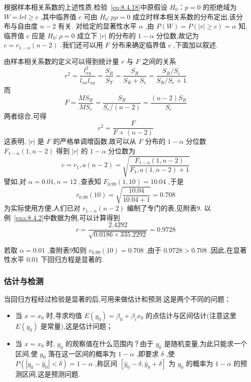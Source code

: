 根据样本相关系数的上述性质,检验~\ref{eq:8.4.18}中原假设 $H_0：p=0$ 的拒绝域为 $W={lrl\ge c}$ ,其中临界值 $c$ 可由 $H_0:p\rho =0$ 成立时样本相关系数的分布定出,该分布与自由度 $n-2$ 有关.
对给定的显著性水平 $\alpha$ ,由 $P(W)=P(|r|\ge c)=\alpha$ 知,临界值 $c$ 应是 $H_0:\rho =0$ 成立下 $|r|$ 的分布的 $1-\alpha$ 分位数,故记为 $c=r_{1-\alpha}(n-2)$ .我们还可以用 $F$ 分布来确定临界值 $c$ ,下面加以叙述.

由样本相关系数的定义可以得到统计量 $r$ 与 $F$ 之间的关系
\begin{equation}
r^{2} =\frac{l_{x y}^{2}}{l_{x x} l_{x y}}=\frac{S_{R}}{S_{T}}=\frac{S_{R}}{S_{R}+S_{e}}=\frac{S_{R} / S_{e}}{S_{R} / S_{e}+1} 
\end{equation}
而
\begin{equation}
F=\frac{MS_R}{MS_e}=\frac{S_R}{S_e/\left( n-2 \right)}=\frac{\left( n-2 \right) S_R}{S_e}
\end{equation}
两者综合,可得
\begin{equation}
r^2=\frac{F}{F+(n-2)}  
\end{equation}
这表明, $|r|$ 是 $F$ 的严格单调增函数,故可以从 $F$ 分布的 $1-\alpha$ 分位数 $F_{1-\alpha}(1,n-2)$ 得到 $|r|$ 的 $1-\alpha$ 分位数为
\begin{equation}
c=r_{1}, a(n-2)=\sqrt{\frac{F_{1-a}(1, n-2)}{F_{1}, a(1, n-2)+1}}
\end{equation}
譬如,对 $\alpha =0.01,n=12$ ,查表知 $F_{0.99}(1,10)=10.04$ ,于是
\begin{equation}
r_{0.99}(10)=\sqrt{\frac{10.04}{10.04+1}}=0.708
\end{equation}
为实际使用方便,人们已对 $r_{1-\alpha}(n-2)$ 编制了专门的表,见附表9.
以例~\ref{exa:8.4.2}中数据为例,可以计算得到
\begin{equation}
r=\frac{2.4292}{\sqrt{0.0186 \times 335.2292}}=0.9728
\end{equation}

若取 $\alpha =0.01$ ,查附表9知则 $r_{0.99}(10)=0.708$ ,由于 $0.9728>0.708$ ,因此,在显著性水平 $0.01$ 下回归方程是显著的.


\subsubsection{估计与检测}\label{sec:8.4.5}

当回归方程经过检验是显著的后,可用来做估计和预测.这是两个不同的问题：
\begin{itemize}
    \item 当 $x=x_0$ 时,寻求均值 $E(y_0)=\beta_0+\beta_ix_0$ 的点估计与区间估计(注意这里 $E(y_0)$ 是常量),这是估计问题；
    \item 当 $x=x_0$ 时, $y_0$ 的观察值在什么范围内？由于 $y_0$ 是随机变量,为此只能求一个区间,使 $y_0$ 落在这一区间的概率为 $1-\alpha$ ,即要求 $\delta$ ,使 $P(|y_0-\hat{y}_0|<\delta)=1-\alpha$ ,称区间 $\left[\hat{y}_{0}-\delta, \hat{y}_{0}+\delta\right]$ 为 $y_0$ 的概率为 $1-\alpha$ 的预测区间,这是预测问题.
\end{itemize}

